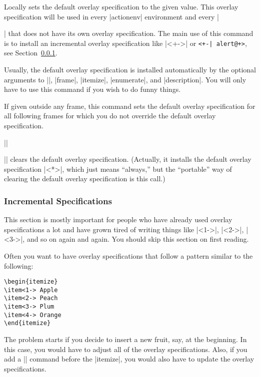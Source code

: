 \begin{command}{\beamerdefaultoverlayspecification{}}
  Locally sets the default overlay specification to the given
  value. This overlay specification will be used in every |actionenv|
  environment and every |\item| that does not have its own overlay
  specification. The main use of this command is to install an
  incremental overlay specification like |<+->| or
  \verb/<+-| alert@+>/, see Section~\ref{section-incremental}.

  Usually, the default overlay specification is installed
  automatically by the optional arguments to |\frame|, |frame|,
  |itemize|, |enumerate|, and |description|. You will only have to use
  this command if you wish to do funny things.

  If given outside any frame, this command sets the default overlay
  specification for all following frames for which you do not override
  the default overlay specification.

  \example |\beamerdefaultoverlayspecification{<+->}|

  \example |\beamerdefaultoverlayspecification{}| clears the default
  overlay specification. (Actually, it installs the default overlay
  specification |<*>|, which just means ``always,'' but the
  ``portable'' way of clearing the default overlay specification is
  this call.)
\end{command}



\subsubsection{Incremental Specifications}
\label{section-incremental}

This section is mostly important for people who have already used
overlay specifications a lot and have grown tired of writing things
like |<1->|, |<2->|, |<3->|, and so on again and again. You should
skip this section on first reading.

Often you want to have overlay specifications that follow a pattern
similar to the following:
\begin{verbatim}
\begin{itemize}
\item<1-> Apple
\item<2-> Peach
\item<3-> Plum
\item<4-> Orange
\end{itemize}
\end{verbatim}
The problem starts if you decide to insert a new fruit, say, at the
beginning. In this case, you would have to adjust all of the overlay
specifications. Also, if you add a |\pause| command before the
|itemize|, you would also have to update the overlay specifications.

